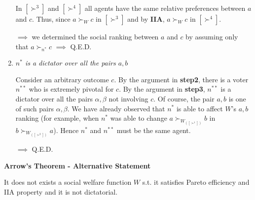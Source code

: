 \begin{enumerate}
	\noindent In $[\succ^3]$ and $[\succ^4]$ all agents have the same relative 
	preferences between $a$ and $c$. Thus, since $a \succ_W c$ in $[\succ^3]$ 
	and by \textbf{IIA}, $a \succ_W c$ in $[\succ^4]$. 

	\noindent $\implies$ we determined the social ranking between $a$ and $c$ 
	by assuming only that $a \succ_{n^*} c$ $\implies$ Q.E.D.

	\item \textit{$n^*$ is a dictator over all the pairs $a,b$}

	\noindent Consider an arbitrary outcome $c$. By the argument in 
	\textbf{step2}, there is a voter $n^{**}$ who is extremely pivotal for $c$. 
	By the argument in \textbf{step3}, $n^{**}$ is a dictator over all the pairs 
	$\alpha,\beta$ not involving $c$. Of course, the pair $a,b$ is one of such 
	pairs $\alpha,\beta$. We have already observed that $n^*$ is able to affect 
	$W$'s $a,b$ ranking (for example, when $n^*$ was able to change 
	$a \succ_{W_{([\succ^1])}} b$ in $b \succ_{W_{([\succ^2])}} a$). Hence $n^*$ and 
	$n^{**}$ must be the same agent.

	\noindent $\implies$ Q.E.D.
\end{enumerate}

\bigskip
\noindent \textbf{Arrow's Theorem - Alternative Statement} 

\noindent It does not exists a social welfare function $W$ s.t. it satisfies Pareto efficiency and IIA property and it is not dictatorial.

%

